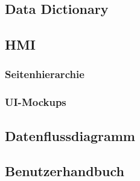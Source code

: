 \subsection{Data Dictionary}
\subsection{HMI}
\subsubsection{Seitenhierarchie}
\subsubsection{UI-Mockups}
\subsection{Datenflussdiagramm}
\subsection{Benutzerhandbuch}